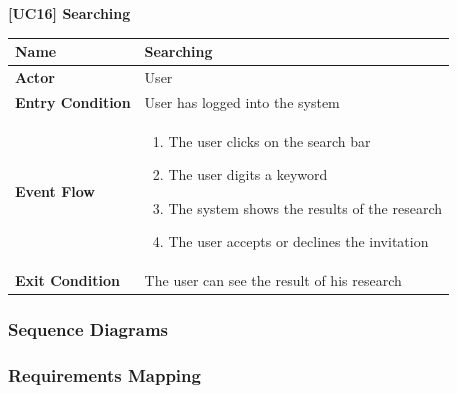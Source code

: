 \documentclass{article}
\begin{document}
\begin{table}
 \renewcommand{\arraystretch}{1.5}
    \centering
    \raggedright\textbf{[UC16] Searching}
    \begin{tabular}{|l|p{10cm}|}
        \hline
        \textbf{Name} & Searching \\
        \hline
        \textbf{Actor} & User \\
        \hline
        \textbf{Entry Condition} & User has logged into the system \\
        \hline
        \textbf{Event Flow} & 
        \begin{enumerate}[align=left, topsep=0pt, partopsep=0pt]
            \item The user clicks on the search bar 
            \item The user digits a keyword
            \item The system shows the results of the research
            \item The user accepts or declines the invitation
        \end{enumerate} \\
        \hline
        \textbf{Exit Condition} & The user can see the result of his research \\
        \hline
    \end{tabular}
\end{table}


\subsubsection{Sequence Diagrams}


\subsubsection{Requirements Mapping}
\end{document}
